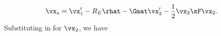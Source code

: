 \begin{equation}
\vx_s = \vx'_1 - R_E\rhat -  \Gmat\vx'_2 - \frac{1}{2}\vx_2 \sF \vx_2.
\end{equation}
Substituting in for $\vx_2$, we have